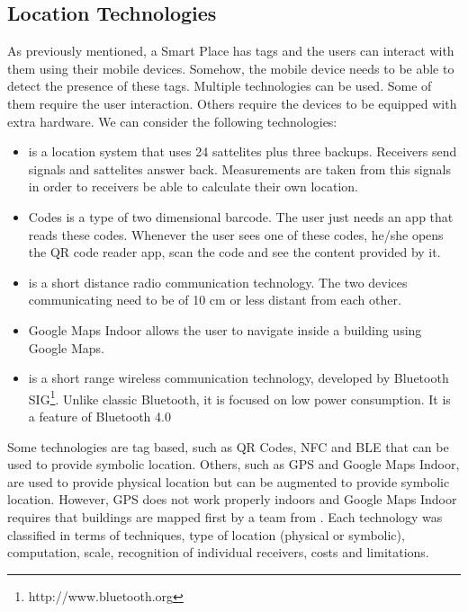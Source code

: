 \subsection{Location Technologies}
\label{sec:background_technologies}
As previously mentioned, a Smart Place has tags and the users can interact with them using their mobile devices.
Somehow, the mobile device needs to be able to detect the presence of these tags.
Multiple technologies can be used.
Some of them require the user interaction.
Others require the devices to be equipped with extra hardware.
We can consider the following technologies:
\begin{itemize}
  \item {}\cite{gps}
  is a location system that uses 24 sattelites plus three backups.
  Receivers send signals and sattelites answer back. Measurements are taken from this signals in order to receivers be able to calculate their own location.
  \item {} Codes
  is a type of two dimensional barcode.
  The user just needs an app that reads these codes.
  Whenever the user sees one of these codes, he/she opens the \gls{QR} code reader app, scan the code and see the content provided by it.
  \item {}\cite{nfc}
  is a short distance radio communication technology.
  The two devices communicating need to be of 10 cm or less distant from each other.
  \item Google Maps Indoor
  allows the user to navigate inside a building using Google Maps.
  \item {}\cite{ble}
  is a short range wireless communication technology, developed by Bluetooth \gls{SIG}\footnote{http://www.bluetooth.org}.
  Unlike classic Bluetooth, it is focused on low power consumption.
  It is a feature of Bluetooth 4.0\cite{bluetooth_specification}
\end{itemize}

Some technologies are tag based, such as \gls{QR} Codes, \gls{NFC} and \gls{BLE} that can be used to provide symbolic location.
Others, such as \gls{GPS} and Google Maps Indoor, are used to provide physical location but can be augmented to provide symbolic location.
However, \gls{GPS} does not work properly indoors and Google Maps Indoor requires that buildings are mapped first by a team from .
Each technology was classified in terms of techniques, type of location (physical or symbolic), computation, scale, recognition of individual receivers, costs and limitations.

